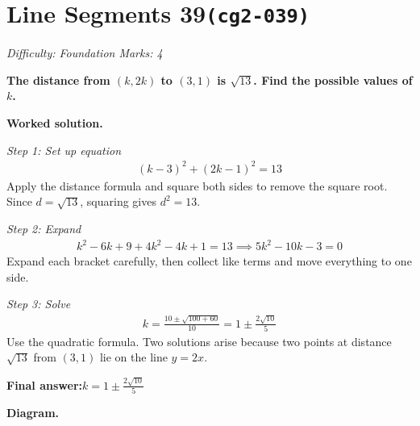 \documentclass[11pt]{article}
\newcommand{\question}[1]{\par\medskip\noindent\textbf{#1}\par}
\begin{document}
\section*{Line Segments 39\quad\small\texttt{(cg2-039)}}
\textit{Difficulty: Foundation \quad\textbar\quad Marks: 4}

\question{The distance from \( (k, 2k) \) to \( (3, 1) \) is \( \sqrt{13} \). Find the possible values of \( k \).}

\textbf{Worked solution.}

\textit{Step 1: Set up equation}
\[\begin{gathered}
(k-3)^2 + (2k-1)^2 = 13
\end{gathered}\]
Apply the distance formula and square both sides to remove the square root. Since \(d = \sqrt{13}\), squaring gives \(d^2 = 13\).

\textit{Step 2: Expand}
\[\begin{gathered}
k^2 - 6k + 9 + 4k^2 - 4k + 1 = 13 \implies 5k^2 - 10k - 3 = 0
\end{gathered}\]
Expand each bracket carefully, then collect like terms and move everything to one side.

\textit{Step 3: Solve}
\[\begin{gathered}
k = \frac{10 \pm \sqrt{100+60}}{10} = 1 \pm \frac{2\sqrt{10}}{5}
\end{gathered}\]
Use the quadratic formula. Two solutions arise because two points at distance \(\sqrt{13}\) from \((3,1)\) lie on the line \(y = 2x\).

\begin{answerbox}
\textbf{Final answer:}\quad \(\displaystyle k = 1 \pm \frac{2\sqrt{10}}{5}\)
\end{answerbox}
\textbf{Diagram.}
\end{document}
